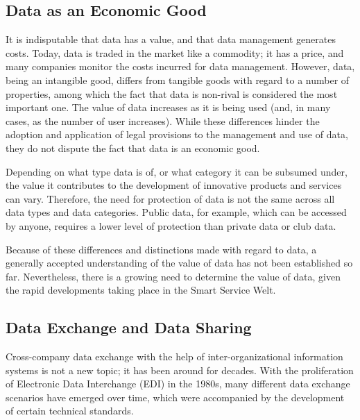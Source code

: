 \subsection{Data as an Economic Good}\label{subsec:data_as_economic_good}
It is indisputable that data has a value, and that data management generates costs. Today, data is traded in the market like a commodity; it has a price, and many companies monitor the costs incurred for data management. However, data, being an intangible good, differs from tangible goods with regard to a number of properties, among which the fact that data is non-rival is considered the most important one. The value of data increases as it is being used (and, in many cases, as the number of user increases). While these differences hinder the adoption and application of legal provisions to the management and use of data, they do not dispute the fact that data is an economic good.

Depending on what type data is of, or what category it can be subsumed under, the value it contributes to the development of innovative products and services can vary. Therefore, the need for protection of data is not the same across all data types and data categories. Public data, for example, which can be accessed by anyone, requires a lower level of protection than private data or club data.

Because of these differences and distinctions made with regard to data, a generally accepted understanding of the value of data has not been established so far. Nevertheless, there is a growing need to determine the value of data, given the rapid developments taking place in the Smart Service Welt.

\subsection{Data Exchange and Data Sharing}\label{subsec:data_exchange_and_data_sharing}
Cross-company data exchange with the help of inter-organizational information systems is not a new topic; it has been around for decades. With the proliferation of Electronic Data Interchange (EDI) in the 1980s, many different data exchange scenarios have emerged over time, which were accompanied by the development of certain technical standards.




